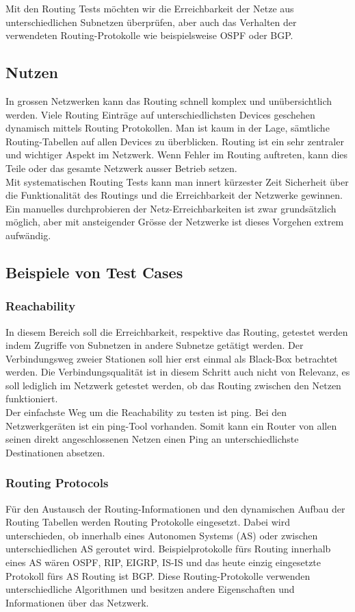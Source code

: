 \documentclass[a4,12pt]{scrartcl}
\begin{document}
\noindent Mit den Routing Tests möchten wir die Erreichbarkeit der Netze aus unterschiedlichen Subnetzen überprüfen, aber auch das Verhalten der verwendeten Routing-Protokolle wie beispielsweise OSPF oder BGP. 
\subsection{Nutzen}
In grossen Netzwerken kann das Routing schnell komplex und unübersichtlich werden. Viele Routing Einträge auf unterschiedlichsten Devices geschehen dynamisch mittels Routing Protokollen. Man ist kaum in der Lage, sämtliche Routing-Tabellen auf allen Devices zu überblicken. Routing ist ein sehr zentraler und wichtiger Aspekt im Netzwerk. Wenn Fehler im Routing auftreten, kann dies Teile oder das gesamte Netzwerk ausser Betrieb setzen.\\

\noindent Mit systematischen Routing Tests kann man innert kürzester Zeit Sicherheit über die Funktionalität des Routings und die Erreichbarkeit der Netzwerke gewinnen. Ein manuelles durchprobieren der Netz-Erreichbarkeiten ist zwar grundsätzlich möglich, aber mit ansteigender Grösse der Netzwerke ist dieses Vorgehen extrem aufwändig. 
\subsection{Beispiele von Test Cases}
\subsubsection{Reachability}
In diesem Bereich soll die Erreichbarkeit, respektive das Routing, getestet werden indem Zugriffe von Subnetzen in andere Subnetze getätigt werden. Der Verbindungsweg zweier Stationen soll hier erst einmal als Black-Box betrachtet werden. Die Verbindungsqualität ist in diesem Schritt auch nicht von Relevanz, es soll lediglich im Netzwerk getestet werden, ob das Routing zwischen den Netzen funktioniert.\\

\noindent Der einfachste Weg um die Reachability zu testen ist ping. Bei den Netzwerkgeräten ist ein ping-Tool vorhanden. Somit kann ein Router von allen seinen direkt angeschlossenen Netzen einen Ping an unterschiedlichste Destinationen absetzen.
\subsubsection{Routing Protocols}
Für den Austausch der Routing-Informationen und den dynamischen Aufbau der Routing Tabellen werden Routing Protokolle eingesetzt. Dabei wird unterschieden, ob innerhalb eines Autonomen Systems (AS) oder zwischen unterschiedlichen AS geroutet wird. Beispielprotokolle fürs Routing innerhalb eines AS wären OSPF, RIP, EIGRP, IS-IS und das heute einzig eingesetzte Protokoll fürs AS Routing ist BGP. Diese Routing-Protokolle verwenden unterschiedliche Algorithmen und besitzen andere Eigenschaften und Informationen über das Netzwerk.\\
\end{document}
